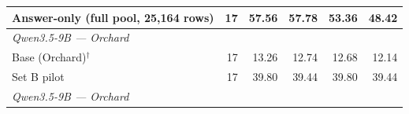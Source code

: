 \begin{table}[t]
{\begin{tabular}{lrrrrr}
Answer-only (full pool, 25,164 rows) & 17 & 57.56 & 57.78 & 53.36 & 48.42 \\
\midrule
\multicolumn{6}{l}{\textit{Qwen3.5-9B --- Orchard}} \\
Base (Orchard)$^{\dagger}$ & 17 & 13.26 & 12.74 & 12.68 & 12.14 \\
Set B pilot & 17 & 39.80 & 39.44 & 39.80 & 39.44 \\
\midrule
\multicolumn{6}{l}{\textit{Qwen3.5-9B --- Orchard}} \\

\end{tabular}}
\end{table}
